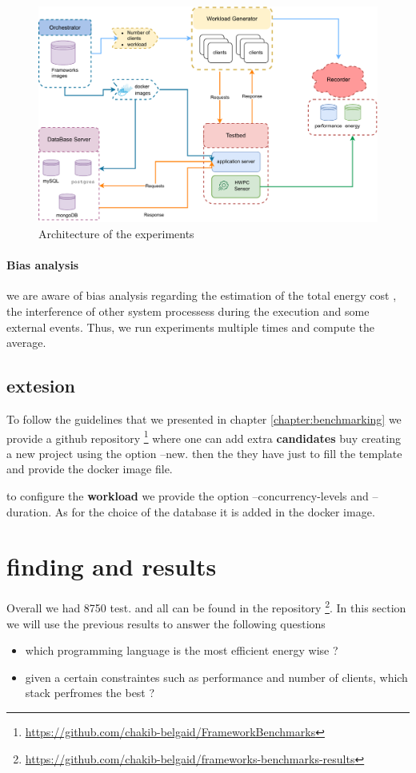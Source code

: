 \begin{figure}[bht]
    \centering
    \includegraphics[width=.8\columnwidth]{imgs/architecture}
    \caption[Architecture]{Architecture of the experiments}
    \label{fig:architecture}
\end{figure}


\paragraph{Bias analysis}
we are aware of bias analysis regarding the estimation of the total energy cost , the interference of other system processess during the execution and some external events. Thus, we run experiments multiple times and compute the average.

\subsection{extesion}
To follow the guidelines that we presented in chapter \ref{chapter:benchmarking} we provide a github repository \footnote{\url{https://github.com/chakib-belgaid/FrameworkBenchmarks}} where one can add extra \textbf{candidates} buy creating a new project using the option --new. then the they have just to fill the template and provide the docker image file. 

to configure the \textbf{workload} we provide the option --concurrency-levels and --duration. 
As for the choice of the database it is added in the docker image. 


\section{finding and results}

Overall we had 8750 test. and all can be found in the repository \footnote{\url{https://github.com/chakib-belgaid/frameworks-benchmarks-results}}.
In this section we will use the previous results to answer the following questions
\begin{itemize}
    \item which programming language is the most efficient energy wise ?
    \item given a certain constraintes such as performance and number of clients, which stack perfromes the best ?
\end{itemize}

